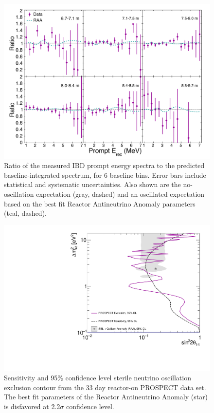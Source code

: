 \begin{figure}[H]
	\centering
	\includegraphics[width=0.9\linewidth]{tex/7-oscillation-images/BaselineSpectra}
	\caption{Ratio of the measured IBD prompt energy spectra to the predicted baseline-integrated spectrum, for 6 baseline bins. Error bars include statistical and systematic uncertainties. Also shown are the no-oscillation expectation (gray, dashed) and an oscillated expectation based on the best fit Reactor Antineutrino Anomaly parameters (teal, dashed). \cite{PhysRevLett.121.251802}}
	\label{fig:baselinespectra}
\end{figure}

\begin{figure}[H]
	\centering
	\includegraphics[width=0.7\linewidth]{tex/7-oscillation-images/Exclusion_Sensitivity_Final}
	\caption[]{Sensitivity and 95\% confidence level sterile neutrino oscillation exclusion contour from the 33 day reactor-on PROSPECT data set. The best fit parameters of the Reactor Antineutrino Anomaly (star) is disfavored at 2.2$\sigma$ confidence level. \cite{PhysRevLett.121.251802}}
	\label{fig:exclusionsensitivityfinal}
\end{figure}


